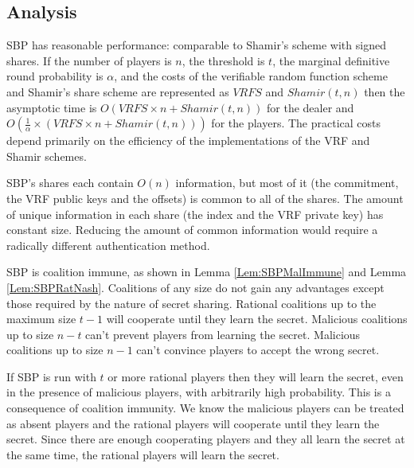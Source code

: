\documentclass{dalcsthesis}
\begin{document}
\subsection{Analysis}

SBP has reasonable performance: comparable to Shamir's scheme with signed shares. If the number of players is $n$, the threshold is $t$, the marginal definitive round probability is $\alpha$, and the costs of the verifiable random function scheme and Shamir's share scheme are represented as $VRFS$ and $Shamir(t, n)$ then the asymptotic time is $O(VRFS \times n + Shamir(t, n))$ for the dealer and $O(\frac{1}{\alpha} \times (VRFS \times n + Shamir(t, n)))$ for the players. The practical costs depend primarily on the efficiency of the implementations of the VRF and Shamir schemes.

SBP's shares each contain $O(n)$ information, but most of it (the commitment, the VRF public keys and the offsets) is common to all of the shares. The amount of unique information in each share (the index and the VRF private key) has constant size. Reducing the amount of common information would require a radically different authentication method.

SBP is coalition immune, as shown in Lemma \ref{Lem:SBPMalImmune} and Lemma \ref{Lem:SBPRatNash}. Coalitions of any size do not gain any advantages except those required by the nature of secret sharing. Rational coalitions up to the maximum size $t-1$ will cooperate until they learn the secret. Malicious coalitions up to size $n-t$ can't prevent players from learning the secret. Malicious coalitions up to size $n-1$ can't convince players to accept the wrong secret.

If SBP is run with $t$ or more rational players then they will learn the secret, even in the presence of malicious players, with arbitrarily high probability. This is a consequence of coalition immunity. We know the malicious players can be treated as absent players and the rational players will cooperate until they learn the secret. Since there are enough cooperating players and they all learn the secret at the same time, the rational players will learn the secret.
\end{document}
